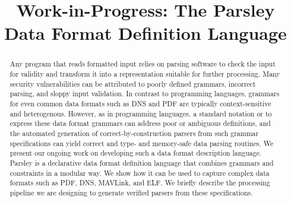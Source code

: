 \documentclass[letterpaper,conference,compsoc]{IEEEtran}
\begin{document}
\title{Work-in-Progress: The Parsley Data Format Definition Language}
\author{
  \and
  }

\maketitle

\begin{abstract}
  Any program that reads formatted input relies on parsing software to check
  the input for validity and transform it into a representation
  suitable for further processing. Many security vulnerabilities can
  be attributed to poorly defined grammars, incorrect parsing, and
  sloppy input validation.  In contrast to programming languages,
  grammars for even common data formats such as DNS and PDF are
  typically context-sensitive and heterogenous.
  However, as in programming languages, a standard notation or  to express these data format grammars can address poor
  or ambiguous definitions, and the automated generation of correct-by-construction
  parsers from such
  grammar specifications can yield correct and type- and memory-safe data parsing routines.
  We present our ongoing work on developing such a data format description language.
  Parsley is a declarative data format definition language that
  combines grammars and constraints in a modular way.  We show how it
  can be used to capture complex data formats such as PDF, DNS, MAVLink, and ELF.
  We briefly describe the processing pipeline we are designing to generate verified parsers
  from these specifications.
\end{abstract}

\lstset{language=parsley}
\end{document}

